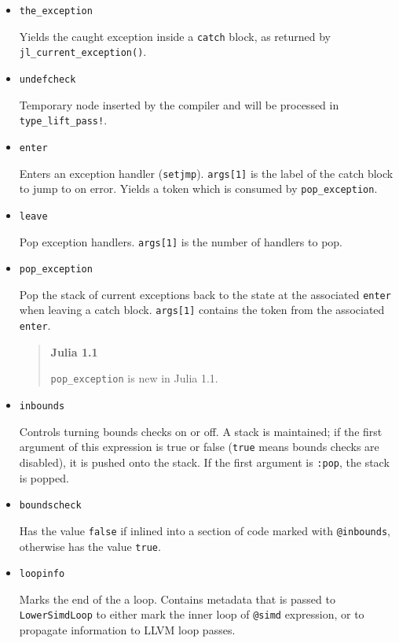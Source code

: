 \begin{itemize}
\item \texttt{the\_exception}

Yields the caught exception inside a \texttt{catch} block, as returned by \texttt{jl\_current\_exception()}.


\item \texttt{undefcheck}

Temporary node inserted by the compiler and will be processed in \texttt{type\_lift\_pass!}.


\item \texttt{enter}

Enters an exception handler (\texttt{setjmp}). \texttt{args[1]} is the label of the catch block to jump to on error.  Yields a token which is consumed by \texttt{pop\_exception}.


\item \texttt{leave}

Pop exception handlers. \texttt{args[1]} is the number of handlers to pop.


\item \texttt{pop\_exception}

Pop the stack of current exceptions back to the state at the associated \texttt{enter} when leaving a catch block. \texttt{args[1]} contains the token from the associated \texttt{enter}.

\begin{quote}
\textbf{Julia 1.1}

\texttt{pop\_exception} is new in Julia 1.1.

\end{quote}

\item \texttt{inbounds}

Controls turning bounds checks on or off. A stack is maintained; if the first argument of this expression is true or false (\texttt{true} means bounds checks are disabled), it is pushed onto the stack. If the first argument is \texttt{:pop}, the stack is popped.


\item \texttt{boundscheck}

Has the value \texttt{false} if inlined into a section of code marked with \texttt{@inbounds}, otherwise has the value \texttt{true}.


\item \texttt{loopinfo}

Marks the end of the a loop. Contains metadata that is passed to \texttt{LowerSimdLoop} to either mark the inner loop of \texttt{@simd} expression, or to propagate information to LLVM loop passes.



\end{itemize}
